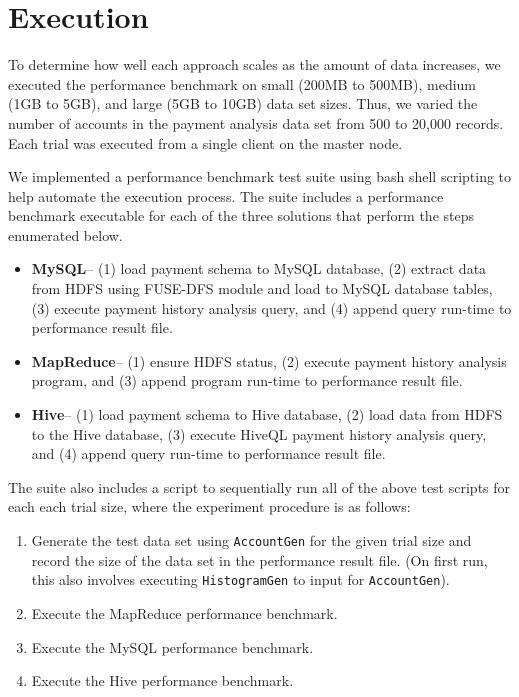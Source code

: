 \section{Execution}
To determine how well each approach scales as the amount of data increases, we executed the performance benchmark on small (200MB to 500MB), medium (1GB to 5GB), and large (5GB to 10GB) data set sizes. Thus, we varied the number of accounts in the payment analysis data set from 500 to 20,000 records. Each trial was executed from a single client on the master node.

We implemented a performance benchmark test suite using bash shell scripting to help automate the execution process. The suite includes a performance benchmark executable for each of the three solutions that perform the steps enumerated below.

\begin{itemize}
 \item \textbf{MySQL}-- (1) load payment schema to MySQL database, (2) extract data from HDFS using FUSE-DFS module and load to MySQL database tables, (3) execute payment history analysis query, and (4) append query run-time to performance result file.
 \item \textbf{MapReduce}-- (1) ensure HDFS status, (2) execute payment history analysis program, and (3) append program run-time to performance result file.
 \item \textbf{Hive}-- (1) load payment schema to Hive database, (2) load data from HDFS to the Hive database, (3) execute HiveQL payment history analysis query, and (4) append query run-time to performance result file.
\end{itemize}

The suite also includes a script to sequentially run all of the above test scripts for each each trial size, where the experiment procedure is as follows:
\begin{enumerate}
 \item Generate the test data set using \texttt{AccountGen} for the given trial size and record the size of the data set in the performance result file. (On first run, this also involves executing \texttt{HistogramGen} to input for \texttt{AccountGen}).
 \item Execute the MapReduce performance benchmark.
 \item Execute the MySQL performance benchmark.
 \item Execute the Hive performance benchmark.
\end{enumerate}

